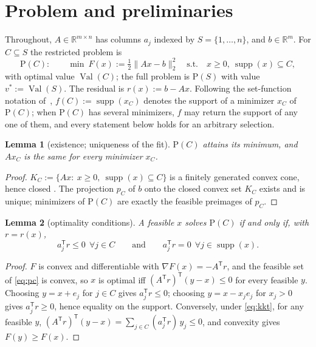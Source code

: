 \documentclass[pdflatex,sn-mathphys-num]{sn-jnl}
\theoremstyle{thmstyleone}
\newtheorem{lemma}{Lemma}
\theoremstyle{thmstyletwo}
\newcommand{\R}{\mathbb{R}}
\newcommand{\supp}{\operatorname{supp}}
\newcommand{\Val}{\operatorname{Val}}
\newcommand{\T}{{\mathsf T}}
\newcommand{\prob}[1]{\mathrm{P}(#1)}
\begin{document}
\section{Problem and preliminaries}\label{sec:prelim}

Throughout, $A\in\R^{m\times n}$ has columns $a_j$ indexed by
$S=\{1,\dots,n\}$, and $b\in\R^m$. For $C\subseteq S$ the restricted
problem is
\begin{equation}\label{eq:pc}
\prob{C}:\qquad \min\ F(x):=\tfrac12\lVert Ax-b\rVert_2^2
\quad\text{s.t.}\quad x\ge 0,\ \supp(x)\subseteq C,
\end{equation}
with optimal value $\Val(C)$; the full problem is $\prob{S}$ with value
$v^*:=\Val(S)$. The residual is $r(x):=b-Ax$. Following the set-function
notation of~\cite{brookes2006}, $f(C):=\supp(x_C)$ denotes the support
of a minimizer $x_C$ of $\prob{C}$; when $\prob{C}$ has several
minimizers, $f$ may return the support of any one of them, and every
statement below holds for an arbitrary selection.

\begin{lemma}[existence; uniqueness of the fit]\label{lem:exist}
$\prob{C}$ attains its minimum, and $Ax_C$ is the same for every
minimizer $x_C$.
\end{lemma}
\begin{proof}
$K_C:=\{Ax:\ x\ge0,\ \supp(x)\subseteq C\}$ is a finitely generated
convex cone, hence closed \cite[Ch.~7]{schrijver1986}. The projection
$p_C$ of $b$ onto the closed convex set $K_C$ exists and is unique;
minimizers of $\prob{C}$ are exactly the feasible preimages of $p_C$.
\end{proof}

\begin{lemma}[optimality conditions]\label{lem:kkt}
A feasible $x$ solves $\prob{C}$ if and only if, with $r=r(x)$,
\begin{equation}\label{eq:kkt}
a_j^{\T}r\le 0\ \ \forall j\in C
\qquad\text{and}\qquad
a_j^{\T}r=0\ \ \forall j\in\supp(x).
\end{equation}
\end{lemma}
\begin{proof}
$F$ is convex and differentiable with $\nabla F(x)=-A^{\T}r$, and the
feasible set of \eqref{eq:pc} is convex, so $x$ is optimal iff
$(A^{\T}r)^{\T}(y-x)\le0$ for every feasible $y$. Choosing $y=x+e_j$
for $j\in C$ gives $a_j^{\T}r\le0$; choosing $y=x-x_je_j$ for
$x_j>0$ gives $a_j^{\T}r\ge0$, hence equality on the support.
Conversely, under \eqref{eq:kkt}, for any feasible $y$,
$(A^{\T}r)^{\T}(y-x)=\sum_{j\in C}(a_j^{\T}r)\,y_j\le0$, and convexity
gives $F(y)\ge F(x)$.
\end{proof}
\end{document}
